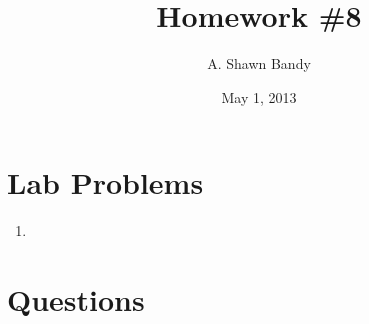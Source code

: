 \documentclass{article}
\begin{document}
\title{Homework \#8}
\author{A. Shawn Bandy}
\date{May 1, 2013}
\maketitle
	\section{Lab Problems}
		\begin{enumerate}[L1]
			\item 
			
		\end{enumerate}
\begingroup
	\section{Questions}\hfill\\
		\let\clearpage\relax
		\begin{enumerate}[Q1]
			
		\end{enumerate}
\endgroup
\end{document}
